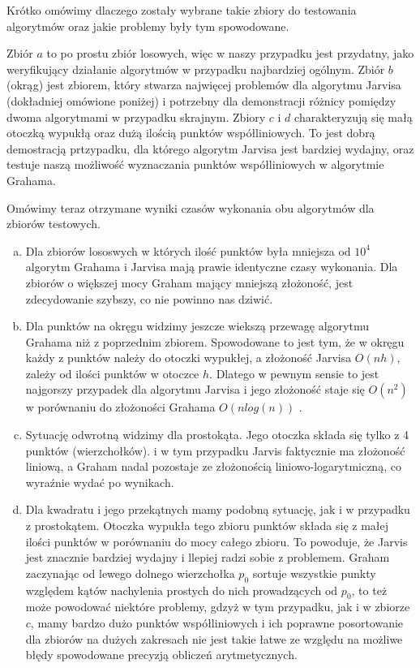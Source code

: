 \quad Krótko omówimy dlaczego zostały wybrane takie zbiory do testowania algorytmów oraz jakie problemy były tym spowodowane.
\par
Zbiór $a$ to po prostu zbiór losowych, więc w naszy przypadku jest przydatny, jako weryfikujący działanie algorytmów w przypadku najbardziej ogólnym. 
Zbiór $b$ (okrąg) jest zbiorem, który stwarza najwięcej problemów dla algorytmu Jarvisa (dokładniej omówione poniżej) i potrzebny dla demonstracji różnicy pomiędzy dwoma algorytmami w 
przypadku skrajnym. Zbiory $c$ i $d$ charakteryzują się małą otoczką wypukłą oraz dużą ilością punktów współliniowych. To jest dobrą demostracją prtzypadku, dla którego algorytm Jarvisa jest bardziej wydajny, 
oraz testuje naszą możliwość wyznaczania punktów współliniowych w algorytmie Grahama.
\par Omówimy teraz otrzymane wyniki czasów wykonania obu algorytmów dla zbiorów testowych. 
\begin{enumerate}[a)]
    \item Dla zbiorów lososwych w których ilość punktów była mniejsza od $10^4$ algorytm Grahama i Jarvisa 
    mają prawie identyczne czasy wykonania. Dla zbiorów o większej mocy Graham mający mniejszą złożoność, jest 
    zdecydowanie szybszy, co nie powinno nas dziwić. 
    \item Dla punktów na okręgu widzimy jeszcze wiekszą przewagę algorytmu Grahama niż z poprzednim zbiorem. 
    Spowodowane to jest tym, że w okręgu każdy z punktów należy do otoczki wypukłej, a złożoność Jarvisa $O(nh)$, zależy od 
    ilości punktów w otoczce $h$. Dlatego w pewnym sensie to jest najgorszy przypadek dla algorytmu Jarvisa i jego złożoność staje się $O(n^2)$ w porównaniu do złożoności Grahama $O(nlog(n))$ .
    \item Sytuację odwrotną widzimy dla prostokąta. Jego otoczka składa się tylko z 4 punktów (wierzchołków). 
    i w  tym przypadku Jarvis faktycznie ma złożoność liniową, a Graham nadal pozostaje ze złożonością liniowo-logarytmiczną, co wyraźnie wydać po wynikach. 
    \item Dla kwadratu i jego przekątnych mamy podobną sytuację, jak i w przypadku z prostokątem. Otoczka wypukła tego zbioru punktów składa się 
    z małej ilości punktów w porównaniu do mocy całego zbioru. To powoduje, że Jarvis jest znacznie bardziej wydajny i llepiej radzi sobie z problemem. 
    Graham zaczynając od lewego dolnego wierzchołka $p_0$ sortuje wszystkie punkty względem kątów nachylenia prostych do nich prowadzących od $p_0$, to też może powodować niektóre problemy, gdzyż w tym przypadku, jak i w zbiorze $c$, mamy bardzo dużo punktów współliniowych i ich poprawne posortowanie dla zbiorów na dużych zakresach nie jest takie łatwe ze względu na możliwe błędy spowodowane precyzją obliczeń arytmetycznych.
\end{enumerate}
